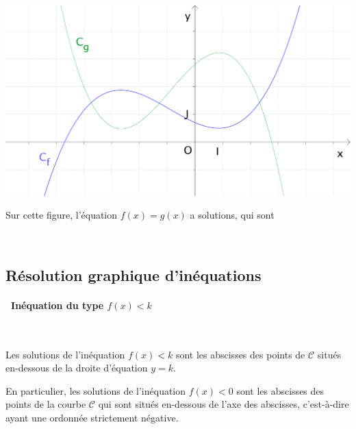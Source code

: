 \pagebreak[4]

\noindent
{} \\[1em]

\begin{minipage}[c]{0.5\linewidth}
  \includegraphics[width=\textwidth]{F_resineq_fg}
\end{minipage}
\qquad
\begin{minipage}[t]{0.4\linewidth}
  Sur cette figure, l'équation $f(x)=g(x)$ a \hspace{1cm} solutions,
  qui sont
\end{minipage} \\[1em]



\subsection{Résolution graphique d'inéquations}

\paragraph{\textbullet \ Inéquation du type $f(x)<k$} \ \par
Les solutions de l'inéquation $f(x)<k$ sont les abscisses des points
de $\mathscr{C}$ situés en-dessous de la droite d'équation $y=k$.

En particulier, les solutions de l'inéquation $f(x)<0$ sont les
abscisses des points de la courbe $\mathscr{C}$ qui sont situés
en-dessous de l'axe des abscisses, c'est-à-dire ayant une ordonnée
strictement négative.\\

